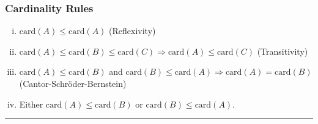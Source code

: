 \documentclass[10pt]{extarticle}
\begin{document}
      \subsubsection{Cardinality Rules}%
      \begin{enumerate}[(i)]
        \item $\text{card}(A) \leq \text{card}(A)$ (Reflexivity)
        \item $\text{card}(A)\leq \text{card}(B) \leq \text{card}(C)\Rightarrow \text{card}(A) \leq \text{card}(C)$ (Transitivity)
        \item $\text{card}(A) \leq \text{card}(B)$ and $\text{card}(B) \leq \text{card}(A) \Rightarrow \text{card}(A) = \text{card}(B)$ (Cantor-Schröder-Bernstein)
        \item Either $\text{card}(A) \leq \text{card}(B)$ or $\text{card}(B) \leq \text{card}(A)$.
      \end{enumerate}
      \vspace{4pt}
      \rule{\textwidth}{0.4pt}
      \vspace{4pt}
\end{document}
